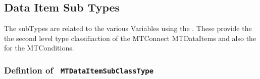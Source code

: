 \FloatBarrier
\subsection{Data Item Sub Types} \label{model:DataItemSubTypes}

The \glspl{subType} are related to the various \glspl{Variable} using the . 
These provide the the second level type classifiaction of the MTConnect \glspl{MTDataItem} and 
also the  for the \glspl{MTCondition}.

\subsubsection{Defintion of \texttt{ MTDataItemSubClassType}}
  \label{type:MTDataItemSubClassType}

